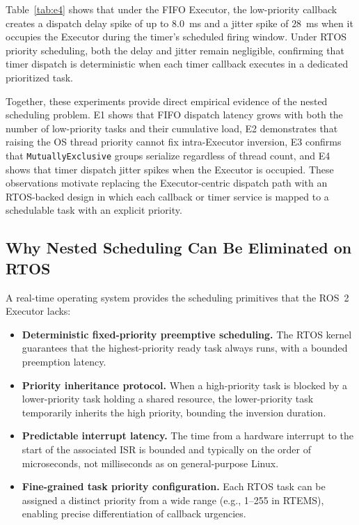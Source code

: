 Table~\ref{tab:e4} shows that under the FIFO Executor, the low-priority callback creates a dispatch delay spike of up to $8.0$~ms and a jitter spike of $28$~ms when it occupies the Executor during the timer's scheduled firing window. Under RTOS priority scheduling, both the delay and jitter remain negligible, confirming that timer dispatch is deterministic when each timer callback executes in a dedicated prioritized task.

Together, these experiments provide direct empirical evidence of the nested scheduling problem. E1 shows that FIFO dispatch latency grows with both the number of low-priority tasks and their cumulative load, E2 demonstrates that raising the OS thread priority cannot fix intra-Executor inversion, E3 confirms that \texttt{MutuallyExclusive} groups serialize regardless of thread count, and E4 shows that timer dispatch jitter spikes when the Executor is occupied. These observations motivate replacing the Executor-centric dispatch path with an RTOS-backed design in which each callback or timer service is mapped to a schedulable task with an explicit priority.

\subsection{Why Nested Scheduling Can Be Eliminated on RTOS}

A real-time operating system provides the scheduling primitives that the ROS~2 Executor lacks:
\begin{itemize}
    \item \textbf{Deterministic fixed-priority preemptive scheduling.} The RTOS kernel guarantees that the highest-priority ready task always runs, with a bounded preemption latency.
    \item \textbf{Priority inheritance protocol.} When a high-priority task is blocked by a lower-priority task holding a shared resource, the lower-priority task temporarily inherits the high priority, bounding the inversion duration.
    \item \textbf{Predictable interrupt latency.} The time from a hardware interrupt to the start of the associated ISR is bounded and typically on the order of microseconds, not milliseconds as on general-purpose Linux.
    \item \textbf{Fine-grained task priority configuration.} Each RTOS task can be assigned a distinct priority from a wide range (e.g., 1--255 in RTEMS), enabling precise differentiation of callback urgencies.
\end{itemize}

